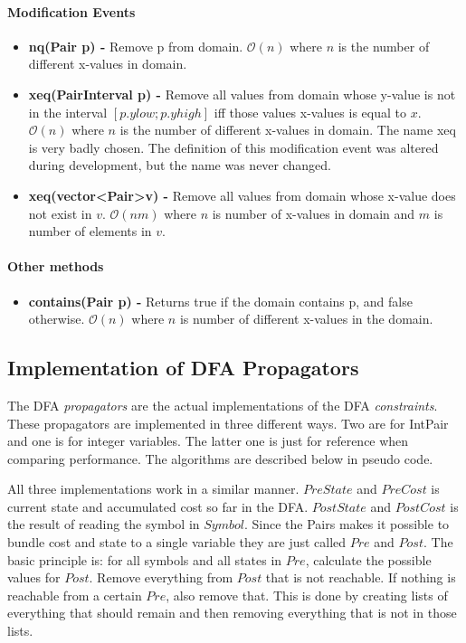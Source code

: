 \documentclass[a4paper,11pt]{article}
\begin{document}
\paragraph{Modification Events}
\begin{itemize}
\item {\textbf{nq(Pair p) - }} Remove p from domain. $\mathcal{O}(n)$ where $n$ is the number of different x-values in domain.

\item{\textbf{xeq(PairInterval p) - }} Remove all values from domain whose y-value is not in the interval $[p.ylow; p.yhigh]$ iff those values x-values is equal to $x$. $\mathcal{O}(n)$ where $n$ is the number of different x-values in domain. The name xeq is very badly chosen. The definition of this modification event was altered during development, but the name was never changed.

\item{\textbf{xeq(vector\textless Pair\textgreater v) - }} Remove all values from domain whose x-value does not exist in $v$. $\mathcal{O}(nm)$ where $n$ is number of x-values in domain and $m$ is number of elements in $v$.
\end{itemize}

\paragraph{Other methods}
\begin{itemize}
\item {\textbf{contains(Pair p) - }} Returns true if the domain contains p, and false otherwise. $\mathcal{O}(n)$ where $n$ is number of different x-values in the domain.
\end{itemize}

\subsection{Implementation of DFA Propagators}
The DFA \textit{propagators} are the actual implementations of the DFA \textit{constraints}. These propagators are implemented in three different ways. Two are for IntPair and one is for integer variables. The latter one is just for reference when comparing performance. The algorithms are described below in pseudo code.

All three implementations work in a similar manner. $PreState$ and $PreCost$ is current state and accumulated cost so far in the DFA. $PostState$ and $PostCost$ is the result of reading the symbol in $Symbol$. Since the Pairs makes it possible to bundle cost and state to a single variable they are just called $Pre$ and $Post$. The basic principle is: for all symbols and all states in $Pre$, calculate the possible values for $Post$. Remove everything from $Post$ that is not reachable. If nothing is reachable from a certain $Pre$, also remove that. This is done by creating lists of everything that should remain and then removing everything that is not in those lists.
\end{document}
